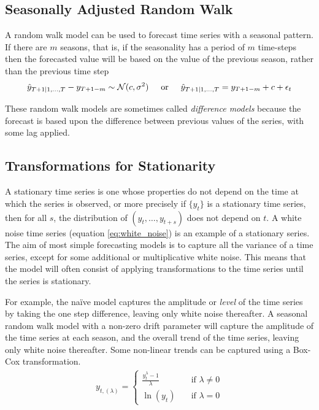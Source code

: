 \documentclass[a4paper,12pt]{article}
\theoremstyle{definition}
\begin{document}
\subsection{Seasonally Adjusted Random Walk}
A random walk model can be used to forecast time series with a seasonal pattern. If there are $m$ seasons, that is, if the seasonality has a period of $m$ time-steps then the forecasted value will be based on the value of the previous season, rather than the previous time step
\begin{align}
	\hat{y}_{T+1|1, \dots, T}  - y_{T+1-m} \sim \mathcal{N}(c,\sigma^2) \hspace{5mm} \text{or} \hspace{5mm} \hat{y}_{T+1|1, \dots, T} =  y_{T+1-m} + c + \epsilon_t
\end{align}

These random walk models are sometimes called \textit{difference models} because the forecast is based upon the difference between previous values of the series, with some lag applied. 

\subsection{Transformations for Stationarity}
A stationary time series is one whose properties do not depend on the time at which the series is observed, or more precisely if $\{y_t\}$ is a stationary time series, then for all $s$, the distribution of $(y_t, \dots ,y_{t+s})$ does not depend on $t$. A white noise time series (equation \ref{eq:white_noise}) is an example of a stationary series. The aim of most simple forecasting models is to capture all the variance of a time series, except for some additional or multiplicative white noise. This means that the model will often consist of applying transformations to the time series until the series is stationary. 

For example, the na\"{i}ve model captures the amplitude or \textit{level} of the time series by taking the one step difference, leaving only white noise thereafter. A seasonal random walk model with a non-zero drift parameter will capture the amplitude of the time series at each season, and the overall trend of the time series, leaving only white noise thereafter. Some non-linear trends can be captured using a Box-Cox transformation. 
\begin{align}
	y_{t, (\lambda)} = \begin{cases}
					\frac{y_t^\lambda - 1}{\lambda} &\quad \text{if } \lambda \neq 0 \\
					\ln(y_t) &\quad \text{if } \lambda = 0 
				\end{cases}
\end{align}
\end{document}
